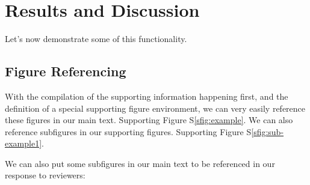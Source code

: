 \section{Results and Discussion}
Let's now demonstrate some of this functionality.
%
    \subsection{Figure Referencing}
%
With the compilation of the supporting information happening first, and the definition of a special supporting figure environment, we can very easily reference these figures in our main text.
Supporting Figure S\ref{sfig:example}.
We can also reference subfigures in our supporting figures.
Supporting Figure S\ref{sfig:sub-example1}.

We can also put some subfigures in our main text to be referenced in our response to reviewers:
